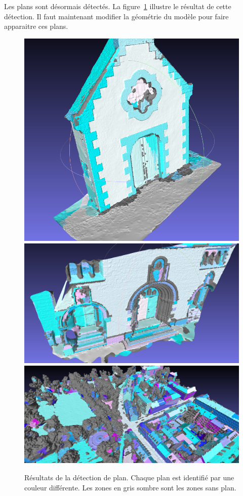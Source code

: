 ﻿\documentclass[12pt, twoside]{article}
\begin{document}
Les plans sont désormais détectés. La figure~\ref{fig:resultPlan} illustre le résultat de cette détection. Il faut maintenant modifier la géométrie du modèle pour faire apparaitre ces plans.

\begin{figure}[h]
\centering
\includegraphics[scale=0.3]{Plan1.png} \includegraphics[scale=0.3]{Plan2.png} \includegraphics[scale=0.3]{Plan3.png}
\caption{\label{fig:resultPlan} Résultats de la détection de plan. Chaque plan est identifié par une couleur différente. Les zones en gris sombre sont les zones sans plan.}
\end{figure}
\end{document}
